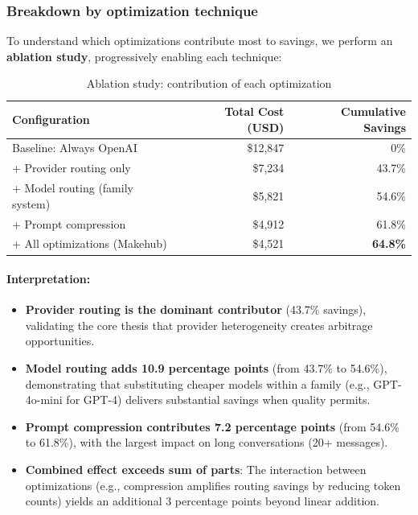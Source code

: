 \documentclass[english]{article}
\begin{document}
\subsubsection{Breakdown by optimization technique}

To understand which optimizations contribute most to savings, we perform an \textbf{ablation study}, progressively enabling each technique:

\begin{table}[H]
\centering
\caption{Ablation study: contribution of each optimization}
\begin{tabular}{|l|r|r|}
\hline
\textbf{Configuration} & \textbf{Total Cost (USD)} & \textbf{Cumulative Savings} \\
\hline
Baseline: Always OpenAI & \$12,847 & 0\% \\
\hline
+ Provider routing only & \$7,234 & 43.7\% \\
\hline
+ Model routing (family system) & \$5,821 & 54.6\% \\
\hline
+ Prompt compression & \$4,912 & 61.8\% \\
\hline
+ All optimizations (Makehub) & \$4,521 & \textbf{64.8\%} \\
\hline
\end{tabular}
\end{table}

\paragraph{Interpretation:}

\begin{itemize}
\item \textbf{Provider routing is the dominant contributor} (43.7\% savings), validating the core thesis that provider heterogeneity creates arbitrage opportunities.

\item \textbf{Model routing adds 10.9 percentage points} (from 43.7\% to 54.6\%), demonstrating that substituting cheaper models within a family (e.g., GPT-4o-mini for GPT-4) delivers substantial savings when quality permits.

\item \textbf{Prompt compression contributes 7.2 percentage points} (from 54.6\% to 61.8\%), with the largest impact on long conversations (20+ messages).

\item \textbf{Combined effect exceeds sum of parts}: The interaction between optimizations (e.g., compression amplifies routing savings by reducing token counts) yields an additional 3 percentage points beyond linear addition.
\end{itemize}
\end{document}
